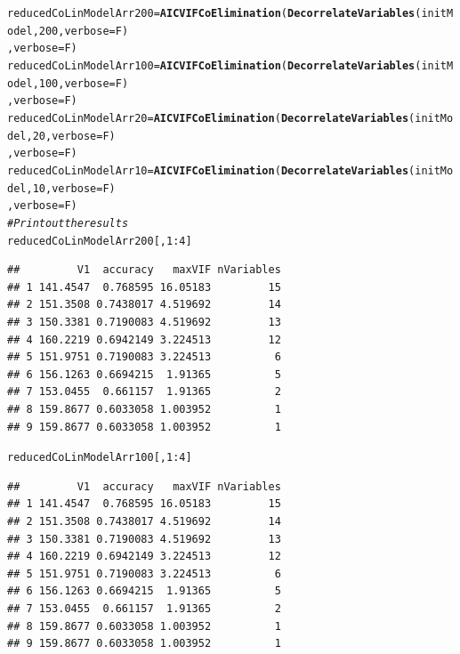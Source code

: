 \documentclass[a4paper]{article}\usepackage[]{graphicx}\usepackage[]{color}
\makeatletter
\newcommand{\hlnum}[1]{\textcolor[rgb]{0.686,0.059,0.569}{#1}}%
\newcommand{\hlcom}[1]{\textcolor[rgb]{0.678,0.584,0.686}{\textit{#1}}}%
\newcommand{\hlopt}[1]{\textcolor[rgb]{0,0,0}{#1}}%
\newcommand{\hlstd}[1]{\textcolor[rgb]{0.345,0.345,0.345}{#1}}%
\newcommand{\hlkwb}[1]{\textcolor[rgb]{0.69,0.353,0.396}{#1}}%
\newcommand{\hlkwc}[1]{\textcolor[rgb]{0.333,0.667,0.333}{#1}}%
\newcommand{\hlkwd}[1]{\textcolor[rgb]{0.737,0.353,0.396}{\textbf{#1}}}%
\newenvironment{kframe}{%
 \def\at@end@of@kframe{}%
 \ifinner\ifhmode%
  \def\at@end@of@kframe{\end{minipage}}%
  \begin{minipage}{\columnwidth}%
 \fi\fi%
 \def\FrameCommand##1{\hskip\@totalleftmargin \hskip-\fboxsep
 \colorbox{shadecolor}{##1}\hskip-\fboxsep
     \hskip-\linewidth \hskip-\@totalleftmargin \hskip\columnwidth}%
 \MakeFramed {\advance\hsize-\width
   \@totalleftmargin\z@ \linewidth\hsize
   \@setminipage}}%
 {\par\unskip\endMakeFramed%
 \at@end@of@kframe}
\newenvironment{knitrout}{}{} %
\makeatother
\begin{document}
\begin{knitrout}
\color{fgcolor}\begin{kframe}
\begin{alltt}
\hlstd{reducedCoLinModelArr200} \hlkwb{=} \hlkwd{AICVIFCoElimination}\hlstd{(}\hlkwd{DecorrelateVariables}\hlstd{(initModel,}\hlnum{200}\hlstd{,}\hlkwc{verbose}\hlstd{=F)}
                                              \hlstd{,}\hlkwc{verbose}\hlstd{=F)}
\hlstd{reducedCoLinModelArr100} \hlkwb{=} \hlkwd{AICVIFCoElimination}\hlstd{(}\hlkwd{DecorrelateVariables}\hlstd{(initModel,}\hlnum{100}\hlstd{,}\hlkwc{verbose}\hlstd{=F)}
                                              \hlstd{,}\hlkwc{verbose}\hlstd{=F)}
\hlstd{reducedCoLinModelArr20} \hlkwb{=} \hlkwd{AICVIFCoElimination}\hlstd{(}\hlkwd{DecorrelateVariables}\hlstd{(initModel,}\hlnum{20}\hlstd{,}\hlkwc{verbose}\hlstd{=F)}
                                             \hlstd{,}\hlkwc{verbose}\hlstd{=F)}
\hlstd{reducedCoLinModelArr10} \hlkwb{=} \hlkwd{AICVIFCoElimination}\hlstd{(}\hlkwd{DecorrelateVariables}\hlstd{(initModel,}\hlnum{10}\hlstd{,}\hlkwc{verbose}\hlstd{=F)}
                                             \hlstd{,}\hlkwc{verbose}\hlstd{=F)}
\hlcom{# Print out the results}
\hlstd{reducedCoLinModelArr200[,}\hlnum{1}\hlopt{:}\hlnum{4}\hlstd{]}
\end{alltt}
\begin{verbatim}
##         V1  accuracy   maxVIF nVariables
## 1 141.4547  0.768595 16.05183         15
## 2 151.3508 0.7438017 4.519692         14
## 3 150.3381 0.7190083 4.519692         13
## 4 160.2219 0.6942149 3.224513         12
## 5 151.9751 0.7190083 3.224513          6
## 6 156.1263 0.6694215  1.91365          5
## 7 153.0455  0.661157  1.91365          2
## 8 159.8677 0.6033058 1.003952          1
## 9 159.8677 0.6033058 1.003952          1
\end{verbatim}
\begin{alltt}
\hlstd{reducedCoLinModelArr100[,}\hlnum{1}\hlopt{:}\hlnum{4}\hlstd{]}
\end{alltt}
\begin{verbatim}
##         V1  accuracy   maxVIF nVariables
## 1 141.4547  0.768595 16.05183         15
## 2 151.3508 0.7438017 4.519692         14
## 3 150.3381 0.7190083 4.519692         13
## 4 160.2219 0.6942149 3.224513         12
## 5 151.9751 0.7190083 3.224513          6
## 6 156.1263 0.6694215  1.91365          5
## 7 153.0455  0.661157  1.91365          2
## 8 159.8677 0.6033058 1.003952          1
## 9 159.8677 0.6033058 1.003952          1

\end{verbatim}
\end{kframe}
\end{knitrout}
\end{document}
